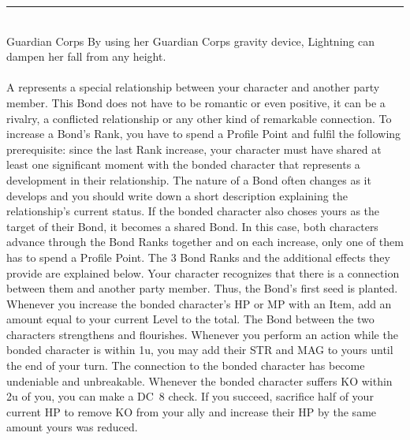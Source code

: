 \documentclass[a4paper, titlepage, 11pt, twocolumn] {article}
\newcommand{\ofprofilerule}{{\color{accent}\rule{1\columnwidth}{0.04cm}}\vspace*{0.1cm}\\}
\begin{document}
\ofprofilerule
{} Guardian Corps\ofrow
By using her Guardian Corps gravity device, Lightning can dampen her fall from any height. \ofrow
{}\ofrow
{}
%
\clearpage
%
%
\\\\
%
A  represents a special relationship between your character and another party member.
This Bond does not have to be romantic or even positive, it can be a rivalry, a conflicted relationship or any other kind of remarkable connection.
To increase a Bond's Rank, you have to spend a Profile Point and fulfil the following prerequisite: since the last Rank increase, your character must have shared at least one significant moment with the bonded character that represents a development in their relationship.
The nature of a Bond often changes as it develops and you should write down a short description explaining the relationship's current status.
If the bonded character also choses yours as the target of their Bond, it becomes a shared Bond.
In this case, both characters advance through the Bond Ranks together and on each increase, only one of them has to spend a Profile Point.
The 3 Bond Ranks and the additional effects they provide are explained below.
%
\vfill
%
 Your character recognizes that there is a connection between them and another party member. Thus, the Bond's first seed is planted. Whenever you increase the bonded character's HP or MP with an Item, add an amount equal to your current Level to the total.\ofrow
{} The Bond between the two characters strengthens and flourishes. Whenever you perform an action while the bonded character is within 1u, you may add their STR and MAG to yours until the end of your turn.\ofrow
{} The connection to the bonded character has become undeniable and unbreakable. Whenever the bonded character suffers KO within 2u of you, you can make a DC~8 check. If you succeed, sacrifice half of your current HP to remove KO from your ally and increase their HP by the same amount yours was reduced.
%
\vfill
%
\end{document}
